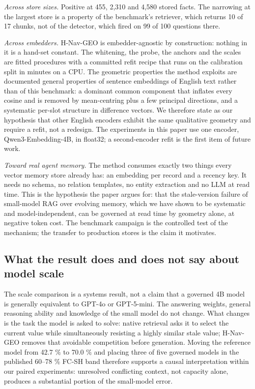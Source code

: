 \documentclass[journal=jcisd8,manuscript=article]{achemso}
\begin{document}
\emph{Across store sizes.} Positive at 455, 2,310 and 4,580 stored facts. The narrowing at the largest store is a property of the benchmark's retriever, which returns 10 of 17 chunks, not of the detector, which fired on 99 of 100 questions there.

\emph{Across embedders.} H-Nav-GEO is embedder-agnostic by construction: nothing in it is a hand-set constant. The whitening, the probe, the anchors and the scales are fitted procedures with a committed refit recipe that runs on the calibration split in minutes on a CPU. The geometric properties the method exploits are documented general properties of sentence embeddings of English text rather than of this benchmark: a dominant common component that inflates every cosine and is removed by mean-centring plus a few principal directions, and a systematic per-slot structure in difference vectors. We therefore state as our hypothesis that other English encoders exhibit the same qualitative geometry and require a refit, not a redesign. The experiments in this paper use one encoder, Qwen3-Embedding-4B, in float32; a second-encoder refit is the first item of future work.

\emph{Toward real agent memory.} The method consumes exactly two things every vector memory store already has: an embedding per record and a recency key. It needs no schema, no relation templates, no entity extraction and no LLM at read time. This is the hypothesis the paper argues for: that the stale-version failure of small-model RAG over evolving memory, which we have shown to be systematic and model-independent, can be governed at read time by geometry alone, at negative token cost. The benchmark campaign is the controlled test of the mechanism; the transfer to production stores is the claim it motivates.

\subsection{What the result does and does not say about model scale}\label{sec:scale-discussion}

The scale comparison is a systems result, not a claim that a governed 4B model is generally equivalent to GPT-4o or GPT-5-mini. The answering weights, general reasoning ability and knowledge of the small model do not change. What changes is the task the model is asked to solve: native retrieval asks it to select the current value while simultaneously resisting a highly similar stale value; H-Nav-GEO removes that avoidable competition before generation. Moving the reference model from 42.7 \% to 70.0 \% and placing three of five governed models in the published 60--78 \% FC-SH band therefore supports a causal interpretation within our paired experiments: unresolved conflicting context, not capacity alone, produces a substantial portion of the small-model error.
\end{document}
